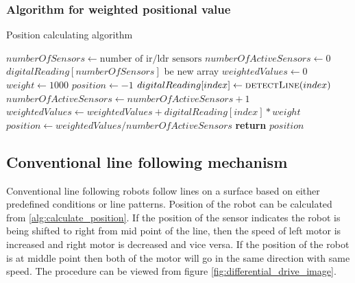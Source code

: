 \documentclass[14pt,a4paper]{extarticle}
\begin{document}
	
	\subsubsection{Algorithm for weighted positional value}
	\begin{algorithm}[H]
			\caption{Position calculating algorithm}\label{alg:calculate_position}
			\begin{algorithmic}[1]
			\State $numberOfSensors	\gets \text{number of ir/ldr	sensors}$	
			\State  $numberOfActiveSensors \gets 0$
			\State  $digitalReading[numberOfSensors]$ be new array
			\State $weightedValues \gets 0$
			\State $weight \gets 1000$ 
			\State  $position \gets -1$
				\State $digitalReading[index] \gets \Call{detectLine}{index}$
					\State $numberOfActiveSensors \gets numberOfActiveSensors + 1$
				\EndIf
				\State $weightedValues \gets weightedValues + digitalReading[index] * weight$
			\EndFor
			\State $position \gets weightedValues / numberOfActiveSensors$
			\State \textbf{return} $position$
			\EndProcedure		
	\end{algorithmic}
\end{algorithm}
	
	


	\subsection{Conventional line following mechanism}
	
	Conventional line following robots follow lines on a surface based on either predefined conditions or line patterns. Position of the robot can be calculated from  \ref{alg:calculate_position}. If the position of the sensor indicates the robot is being shifted to right from mid point of the line, then the speed of left motor is increased and right motor is decreased and vice versa. If the position of the robot is at middle point then both of the motor will go in the same direction with same speed. The procedure can be viewed from figure \ref{fig:differential_drive_image}.
	
\end{document}
